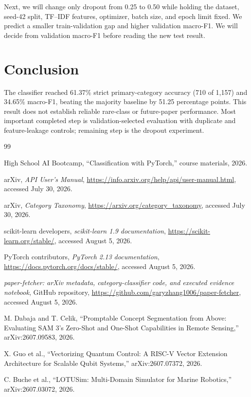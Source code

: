 \documentclass[10pt]{article}
\begin{document}
Next, we will change only dropout from 0.25 to 0.50 while
holding the dataset, seed-42 split, TF--IDF features, optimizer, batch size, and
epoch limit fixed. We predict a smaller train-validation gap and higher
validation macro-F1. We will decide from validation macro-F1 before reading the
new test result.

\section{Conclusion}

The classifier reached 61.37\% strict primary-category accuracy (710 of 1,157)
and 34.65\% macro-F1, beating the majority baseline by 51.25 percentage points.
This result does not establish reliable rare-class or future-paper performance.
Most important completed step is validation-selected evaluation with duplicate
and feature-leakage controls; remaining step is the dropout experiment.

\begin{thebibliography}{99}
\fontsize{8}{8.4}\selectfont
\setlength{\itemsep}{0pt}
\setlength{\parskip}{0pt}

High School AI Bootcamp, ``Classification with PyTorch,'' course materials,
2026.

arXiv, \emph{API User's Manual},
\url{https://info.arxiv.org/help/api/user-manual.html}, accessed July 30, 2026.

arXiv, \emph{Category Taxonomy},
\url{https://arxiv.org/category_taxonomy}, accessed July 30, 2026.

scikit-learn developers, \emph{scikit-learn 1.9 documentation},
\url{https://scikit-learn.org/stable/}, accessed August 5, 2026.

PyTorch contributors, \emph{PyTorch 2.13 documentation},
\url{https://docs.pytorch.org/docs/stable/}, accessed August 5, 2026.

\emph{paper-fetcher: arXiv metadata, category-classifier code, and executed
evidence notebook}, GitHub repository,
\url{https://github.com/garyzhang1006/paper-fetcher}, accessed August 5, 2026.

M. Dabaja and T. Celik, ``Promptable Concept Segmentation from Above:
Evaluating SAM 3's Zero-Shot and One-Shot Capabilities in Remote Sensing,''
arXiv:2607.09583, 2026.

X. Guo et al., ``Vectorizing Quantum Control: A RISC-V Vector Extension
Architecture for Scalable Qubit Systems,'' arXiv:2607.07372, 2026.

C. Buche et al., ``LOTUSim: Multi-Domain Simulator for Marine Robotics,''
arXiv:2607.03072, 2026.

\end{thebibliography}
\end{document}
